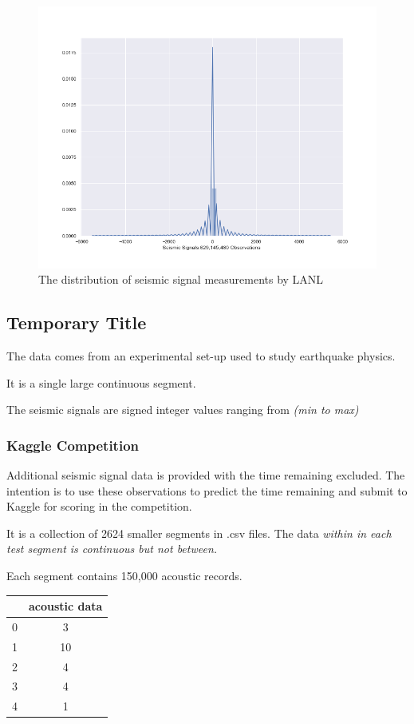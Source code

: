 \documentclass[]{llncs}
\begin{document}
\begin{figure}
	\centering
	\includegraphics[width=.8\linewidth]{../GPUProject/acousticRand60000DistPlot}
	\caption{The distribution of seismic signal measurements by LANL}
	\label{fig:acousticRand60000DistPlot}
\end{figure}

\subsection{Temporary Title}
The data comes from an experimental set-up used to study earthquake physics. 

It is a single large continuous segment.

The seismic signals are signed integer values ranging from \emph{(min to max)}
 
\subsubsection{Kaggle Competition}
Additional seismic signal data is provided with the time remaining excluded. The intention is to use these observations to predict the time remaining and submit to Kaggle for scoring in the competition.\par

It is a collection of 2624 smaller segments in .csv files. The data \em{within} in each test segment is continuous but not \em{between}.

Each segment contains 150,000 acoustic records. \par

\begin{tabular}{|c|c|}
	\hline 
	 & acoustic data \\ 
	\hline 
	0 & 3 \\ 
	\hline 
	1 & 10 \\ 
	\hline 
	2 & 4 \\ 
	\hline 
	3 & 4 \\ 
	\hline 
	4 & 1 \\ 
	\hline 
\end{tabular} 
\end{document}

